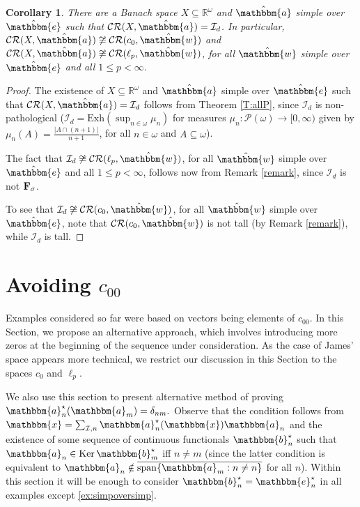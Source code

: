 \documentclass{amsart}
\newcommand{\on}{\operatorname}
\newcommand{\I}{\mathcal{I}}
\newcommand{\Exh}{\mathrm{Exh}}
\newcommand{\CR}{\mathcal{CR}}
\newcommand{\w}{\mathbbm}
\newtheorem{corollary}[theorem]{Corollary}
\begin{document}
\begin{corollary}
There are a Banach space $X\subseteq \mathbb{R}^\omega$ and $\hat{\w{a}}$ simple over $\hat{\w{e}}$ such that $\CR(X,\hat{\w{a}})=\I_d$. In particular,  $\CR(X,\hat{\w{a}})\not\cong\CR(c_0,\hat{\w{w}})$ and $\CR(X,\hat{\w{a}})\not\cong\CR(\ell_p,\hat{\w{w}})$, for all $\hat{\w{w}}$ simple over $\hat{\w{e}}$ and all $1\leq p<\infty$.
\end{corollary}

\begin{proof}
The existence of $X\subseteq \mathbb{R}^\omega$ and $\hat{\w{a}}$ simple over $\hat{\w{e}}$ such that $\CR(X,\hat{\w{a}})=\I_d$ follows from Theorem \ref{T:allP}, since $\I_d$ is non-pathological ($\I_d=\Exh(\sup_{n\in\omega}\mu_n)$ for measures $\mu_n:\mathcal{P}(\omega)\to[0,\infty)$ given by $\mu_n(A)=\frac{|A\cap(n+1)|}{n+1}$, for all $n\in\omega$ and $A\subseteq\omega$).

The fact that $\I_d\not\cong\CR(\ell_p,\hat{\w{w}})$, for all $\hat{\w{w}}$ simple over $\hat{\w{e}}$ and all $1\leq p<\infty$, follows now from Remark \ref{remark}, since $\I_d$ is not $\bf{F_\sigma}$.

To see that $\I_d\not\cong\CR(c_0,\hat{\w{w}})$, for all $\hat{\w{w}}$ simple over $\hat{\w{e}}$, note that $\CR(c_0,\hat{\w{w}})$ is not tall (by Remark \ref{remark}), while $\I_d$ is tall. 
\end{proof}



\section{Avoiding $c_{00}$}\label{S:avoidingC}

Examples considered so far were based on vectors being elements of $c_{00}$. In this Section, we propose an alternative approach, which involves introducing more zeros at the beginning of the sequence under consideration. As the case of James’ space appears more technical, we restrict our discussion in this Section to the spaces $c_0$ and $\ell_p$.

We also use this section to present alternative method of proving $\w{a}^\star_n(\w{a}_m)=\delta_{nm}.$ Observe that the condition follows from $\w{x}=\sum_{\I,n} \w{a}^\star_n(\w{x})\w{a}_n$ and the existence of some sequence of continuous functionals $\w{b}_n^\star$ such that $\w{a}_n\in\on{Ker}\w{b}^\star_m$ iff $n\neq m$ (since the latter condition is equivalent to $\w{a}_n\notin \overline{\on{span}\{\w{a}_m:n\neq n\}}$ for all $n$). Within this section it will be enough to consider $\w{b}^\star_n=\w{e}_n^\star$ in all examples except \ref{ex:simpoversimp}. 
\end{document}
